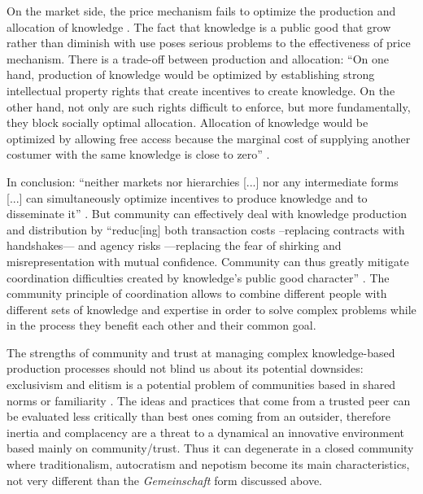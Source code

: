 On the market side, the price mechanism fails to optimize the production and allocation of knowledge \citep{arrow:1962,stiglitz:1996}. The fact that knowledge is a public good that grow rather than diminish with use poses serious problems to the effectiveness of price mechanism. There is a trade-off between production and allocation: ``On one hand, production of knowledge would be optimized by establishing strong intellectual property rights that create incentives to create knowledge. On the other hand, not only are such rights difficult to enforce, but more fundamentally, they block socially optimal allocation. Allocation of knowledge would be optimized by allowing free access because the marginal cost of supplying another costumer with the same knowledge is close to zero'' \citep[217]{adler:2001}.

In conclusion: ``neither markets nor hierarchies [...] nor any intermediate forms [...] can simultaneously optimize incentives to produce knowledge and to disseminate it'' \citep[29]{adler:2006}. But community can effectively deal with knowledge production and distribution by ``reduc[ing] both transaction costs --replacing contracts with handshakes--- and agency risks ---replacing the fear of shirking and misrepresentation with mutual confidence. Community can thus greatly mitigate coordination difficulties created by knowledge's public good character'' \citep[30]{adler:2006}. The community principle of coordination allows to combine different people with different sets of knowledge and expertise in order to solve complex problems while in the process they benefit each other and their common goal.

The strengths of community and trust at managing complex knowledge-based production processes should not blind us about its potential downsides: exclusivism and elitism is a potential problem of communities based in shared norms or familiarity \citep[226]{adler:2001}. The ideas and practices that come from a trusted peer can be evaluated less critically than best ones coming from an outsider, therefore inertia and complacency are a threat to a dynamical an innovative environment based mainly on community/trust. Thus it can degenerate in a closed community where traditionalism, autocratism and nepotism become its main characteristics, not very different than the \emph{Gemeinschaft} form discussed above.

